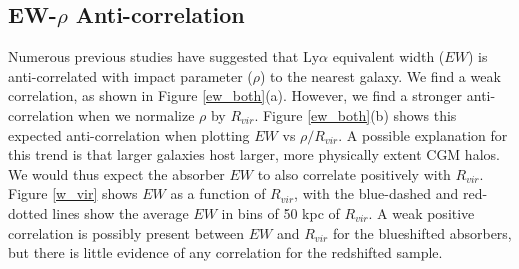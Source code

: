 \documentclass[iop]{emulateapj-rtx4}
\begin{document}




\subsection{EW-$\rho$ Anti-correlation}
Numerous previous studies have suggested that Ly$\alpha$ equivalent width ($EW$) is anti-correlated with impact parameter ($\rho$) to the nearest galaxy. We find a weak correlation, as shown in Figure \ref{ew_both}(a). However, we find a stronger anti-correlation when we normalize $\rho$ by $R_{vir}$. Figure \ref{ew_both}(b) shows this expected anti-correlation when plotting $EW$ vs $\rho/R_{vir}$. A possible explanation for this trend is that larger galaxies host larger, more physically extent CGM halos. We would thus expect the absorber $EW$ to also correlate positively with $R_{vir}$. Figure \ref{w_vir} shows $EW$ as a function of $R_{vir}$, with the blue-dashed and red-dotted lines show the average $EW$ in bins of 50 kpc of $R_{vir}$. A weak positive correlation is possibly present between $EW$ and $R_{vir}$ for the blueshifted absorbers, but there is little evidence of any correlation for the redshifted sample. 
\end{document}
